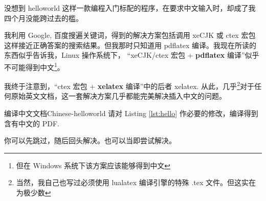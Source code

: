 没想到 helloworld 这样一款编程入门标配的程序，在要求中文输入时，却成了我四个月没能跨过去的槛。

我利用 Google, 百度搜遍关键词，得到的解决方案包括调用 xeCJK 或 ctex 宏包这样接近正确答案的搜索结果。但我那时只知道用 pdflatex 编译。我现在所读的东西似乎告诉我，Linux 操作系统下， “xeCJK/ctex 宏包 + \textbf{pdflatex} 编译”似乎不可能得到中文\footnote{但在 Windows 系统下该方案应该能够得到中文}。

我终于注意到，“ctex 宏包 + \textbf{xelatex} 编译”中的后者 xelatex. 从此，几乎\footnote{当然，我自己也写过必须使用 lualatex 编译引擎的特殊 .tex 文件。但这实在为极少数}对于任何原始英文文档，这一套解决方案几乎都能完美解决插入中文的问题。

\begin{Ex}{编译中文文档}{Chinese-helloworld}
请对 Listing \ref{lst:hello} 作必要的修改，编译得到含有中文的 PDF.

你可以先跳过，随后回头解决。也可以当即尝试解决。
\end{Ex}